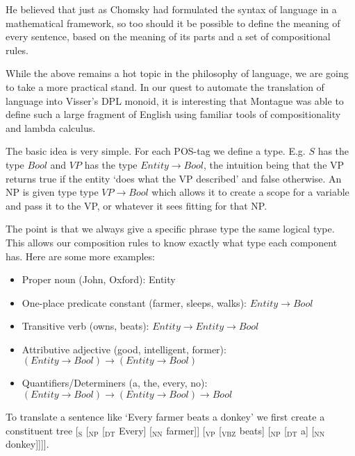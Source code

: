 \documentclass[12pt]{article}
\begin{document}
He believed that just as Chomsky had formulated the syntax of language in a mathematical framework, so too should it be possible to define the meaning of every sentence, based on the meaning of its parts and a set of compositional rules.

While the above remains a hot topic in the philosophy of language, we are going to take a more practical stand. In our quest to automate the translation of language into Visser's DPL monoid, it is interesting that Montague was able to define such a large fragment of English using familiar tools of compositionality and lambda calculus.

The basic idea is very simple. For each POS-tag we define a type. E.g. $S$ has the type $Bool$ and $VP$ has the type $Entity \rightarrow Bool$, the intuition being that the VP returns true if the entity `does what the VP described' and false otherwise. An NP is given type type $VP \rightarrow Bool$ which allows it to create a scope for a variable and pass it to the VP, or whatever it sees fitting for that NP.

The point is that we always give a specific phrase type the same logical type. This allows our composition rules to know exactly what type each component has. Here are some more examples:
\begin{itemize}
\item Proper noun (John, Oxford): Entity
\item One-place predicate constant (farmer, sleeps, walks): $Entity \rightarrow Bool$
\item Transitive verb (owns, beats): $Entity \rightarrow Entity \rightarrow Bool$
\item Attributive adjective (good, intelligent, former): $(Entity \rightarrow Bool) \rightarrow (Entity \rightarrow Bool)$
\item Quantifiers/Determiners (a, the, every, no): $(Entity \rightarrow Bool) \rightarrow (Entity \rightarrow Bool) \rightarrow Bool$
\end{itemize}

To translate a sentence like `Every farmer beats a donkey' we first create a constituent tree [$_\text{S}$ [$_\text{NP}$ [$_\text{DT}$ Every] [$_\text{NN}$ farmer]] [$_\text{VP}$ [$_\text{VBZ}$ beats] [$_\text{NP}$ [$_\text{DT}$ a] [$_\text{NN}$ donkey]]]].
\end{document}
